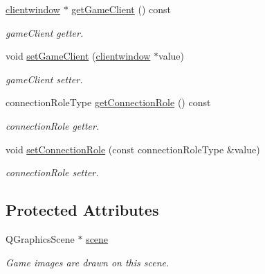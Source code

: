 \begin{DoxyCompactItemize}
\mbox{\hyperlink{classclientwindow}{clientwindow}} $\ast$ \mbox{\hyperlink{classgame_window_a69e38c52ddea9d76beea2b7ad38b399e}{get\+Game\+Client}} () const
\begin{DoxyCompactList}\small\item\em game\+Client getter. \end{DoxyCompactList}\item 
\mbox{\label{classgame_window_ad9fdccffaca852e5f7ad31ec54c0c619}} 
void \mbox{\hyperlink{classgame_window_ad9fdccffaca852e5f7ad31ec54c0c619}{set\+Game\+Client}} (\mbox{\hyperlink{classclientwindow}{clientwindow}} $\ast$value)
\begin{DoxyCompactList}\small\item\em game\+Client setter. \end{DoxyCompactList}\item 
\mbox{\label{classgame_window_ad597375ea2f848cf27da3eb725219c53}} 
connection\+Role\+Type \mbox{\hyperlink{classgame_window_ad597375ea2f848cf27da3eb725219c53}{get\+Connection\+Role}} () const
\begin{DoxyCompactList}\small\item\em connection\+Role getter. \end{DoxyCompactList}\item 
\mbox{\label{classgame_window_ad00607412c93c7b157ef7e3ec1a2e7df}} 
void \mbox{\hyperlink{classgame_window_ad00607412c93c7b157ef7e3ec1a2e7df}{set\+Connection\+Role}} (const connection\+Role\+Type \&value)
\begin{DoxyCompactList}\small\item\em connection\+Role setter. \end{DoxyCompactList}\end{DoxyCompactItemize}
\subsection*{Protected Attributes}
\begin{DoxyCompactItemize}
\item 
\mbox{\label{classgame_window_a22f5b5b08120edb4eb1e15845efd07ec}} 
Q\+Graphics\+Scene $\ast$ \mbox{\hyperlink{classgame_window_a22f5b5b08120edb4eb1e15845efd07ec}{scene}}
\begin{DoxyCompactList}\small\item\em Game images are drawn on this scene. \end{DoxyCompactList}\end{DoxyCompactItemize}


